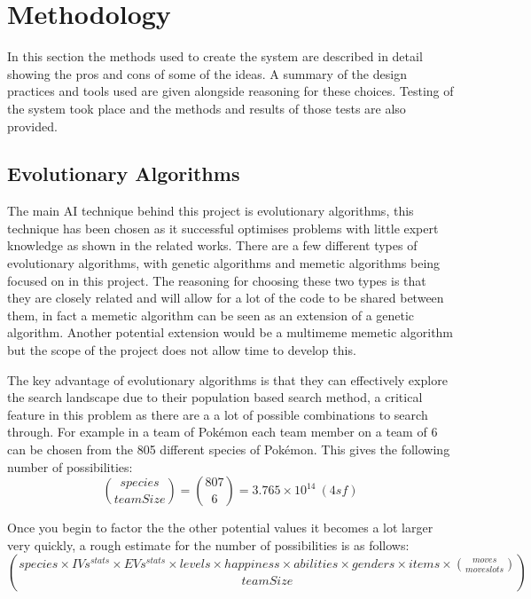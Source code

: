 \documentclass[a4paper]{article}
\newcommand{\Pokemon}{Pok\'{e}mon}
\begin{document}
\section{Methodology}
In this section the methods used to create the system are described in detail showing the pros and cons of some of the ideas.
A summary of the design practices and tools used are given alongside reasoning for these choices.
Testing of the system took place and the methods and results of those tests are also provided.
\subsection{Evolutionary Algorithms}
\par
The main AI technique behind this project is evolutionary algorithms, this technique has been chosen as it successful optimises problems with little expert knowledge as shown in the related works.
There are a few different types of evolutionary algorithms, with genetic algorithms and memetic algorithms being focused on in this project.
The reasoning for choosing these two types is that they are closely related and will allow for a lot of the code to be shared between them, in fact a memetic algorithm can be seen as an extension of a genetic algorithm.
Another potential extension would be a multimeme memetic algorithm but the scope of the project does not allow time to develop this.
\par
The key advantage of evolutionary algorithms is that they can effectively explore the search landscape due to their population based search method, a critical feature in this problem as there are a a lot of possible combinations to search through.
For example in a team of \Pokemon{} each team member on a team of 6 can be chosen from the 805 different species of \Pokemon{}.
This gives the following number of possibilities:
\begin{equation}
{species \choose teamSize} = {807 \choose 6} = 3.765 \times 10^{14}\ (4sf) %
\end{equation}
\par
Once you begin to factor the the other potential values it becomes a lot larger very quickly, a rough estimate for the number of possibilities is as follows:
\begin{equation}
{species \times IVs^{stats} \times EVs^{stats} \times levels \times happiness \times abilities \times genders \times items \times {moves \choose move slots} \choose teamSize}
\end{equation}
\end{document}
